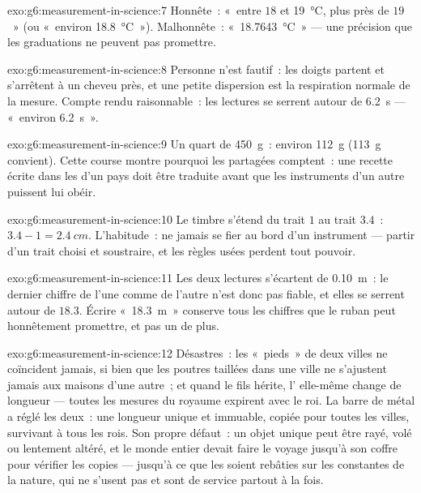 \begin{solution}{exo:g6:measurement-in-science:7}
Honnête~: «~entre $18$ et \qty{19}{\celsius}, plus près de $19$~» (ou
«~environ \qty{18.8}{\celsius}~»). Malhonnête~:
«~\qty{18.7643}{\celsius}~» --- une précision que les graduations ne
peuvent pas promettre.
\end{solution}

\begin{solution}{exo:g6:measurement-in-science:8}
Personne n'est fautif~: les doigts partent et s'arrêtent à un cheveu
près, et une petite dispersion est la respiration normale de la
mesure. Compte rendu raisonnable~: les lectures se serrent autour de
\qty{6.2}{s} --- «~environ \qty{6.2}{s}~».
\end{solution}

\begin{solution}{exo:g6:measurement-in-science:9}
Un quart de \qty{450}{g}~: environ \qty{112}{g} (\qty{113}{g}
convient). Cette course montre pourquoi les  partagées
comptent~: une recette écrite dans les  d'un pays doit être
traduite avant que les instruments d'un autre puissent lui obéir.
\end{solution}

\begin{solution}{exo:g6:measurement-in-science:10}
Le timbre s'étend du trait $1$ au trait $3.4$~:
$3.4 - 1 = \qty{2.4}{cm}$. L'habitude~: ne jamais se fier au bord
d'un instrument --- partir d'un trait choisi et soustraire, et les
règles usées perdent tout pouvoir.
\end{solution}

\begin{solution}{exo:g6:measurement-in-science:11}
Les deux lectures s'écartent de \qty{0.10}{m}~: le dernier chiffre de
l'une comme de l'autre n'est donc pas fiable, et elles se serrent
autour de $18.3$. Écrire «~\qty{18.3}{m}~» conserve tous les
chiffres que le ruban peut honnêtement promettre, et pas un de plus.
\end{solution}

\begin{solution}{exo:g6:measurement-in-science:12}
Désastres~: les «~pieds~» de deux villes ne coïncident jamais, si
bien que les poutres taillées dans une ville ne s'ajustent jamais aux
maisons d'une autre~; et quand le fils hérite, l' elle-même
change de longueur --- toutes les mesures du royaume expirent avec le
roi. La barre de métal a réglé les deux~: une longueur unique et
immuable, copiée pour toutes les villes, survivant à tous les rois.
Son propre défaut~: un objet unique peut être rayé, volé ou
lentement altéré, et le monde entier devait faire le voyage jusqu'à
son coffre pour vérifier les copies --- jusqu'à ce que les 
soient rebâties sur les constantes de la nature, qui ne s'usent pas
et sont de service partout à la fois.
\end{solution}


